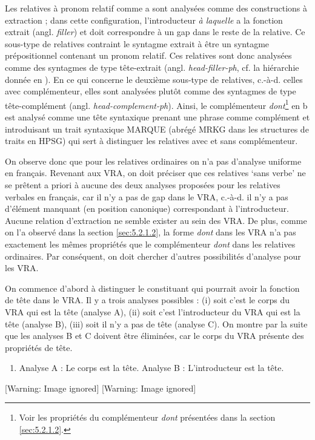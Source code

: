 Les relatives à pronom relatif comme a sont analysées comme des constructions à extraction ; dans cette configuration, l'introducteur \textit{à laquelle} a la fonction extrait (angl. \textit{filler}) et doit correspondre à un gap dans le reste de la relative. Ce sous-type de relatives contraint le syntagme extrait à être un syntagme prépositionnel contenant un pronom relatif. Ces relatives sont donc analysées comme des syntagmes de type tête-extrait (angl. \textit{head-filler-ph}, cf. la hiérarchie donnée en ). En ce qui concerne le deuxième sous-type de relatives, c.-à-d. celles avec complémenteur, elles sont analysées plutôt comme des syntagmes de type tête-complément (angl. \textit{head-complement-ph}). Ainsi, le complémenteur \textit{dont}\footnote{Voir les propriétés du complémenteur \textit{dont} présentées dans la section \ref{sec:5.2.1.2}.}  en b est analysé comme une tête syntaxique prenant une phrase comme complément et introduisant un trait syntaxique MARQUE (abrégé MRKG dans les structures de traits en HPSG) qui sert à distinguer les relatives avec et sans complémenteur.

On observe donc que pour les relatives ordinaires on n'a pas d'analyse uniforme en français. Revenant aux VRA, on doit préciser que ces relatives `sans verbe' ne se prêtent a priori à aucune des deux analyses proposées pour les relatives verbales en français, car il n'y a pas de gap dans le VRA, c.-à-d. il n'y a pas d'élément manquant (en position canonique) correspondant à l'introducteur. Aucune relation d'extraction ne semble exister au sein des VRA. De plus, comme on l'a observé dans la section \ref{sec:5.2.1.2}, la forme \textit{dont} dans les VRA n'a pas exactement les mêmes propriétés que le complémenteur \textit{dont} dans les relatives ordinaires. Par conséquent, on doit chercher d'autres possibilités d'analyse pour les VRA. 

On commence d'abord à distinguer le constituant qui pourrait avoir la fonction de tête dans le VRA. Il y a trois analyses possibles : (i) soit c'est le corps du VRA qui est la tête (analyse A), (ii) soit c'est l'introducteur du VRA qui est la tête (analyse B), (iii) soit il n'y a pas de tête (analyse C). On montre par la suite que les analyses B et C doivent être éliminées, car le corps du VRA présente des propriétés de tête. 


\begin{enumerate}
\item   Analyse A : Le corps est la tête.    Analyse B : L'introducteur est la tête.


\end{enumerate}
  [Warning: Image ignored] %
     [Warning: Image ignored] %
 

